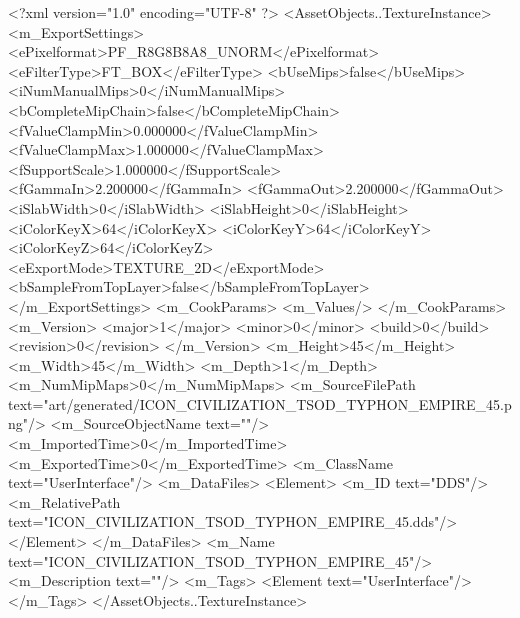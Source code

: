 <?xml version="1.0" encoding="UTF-8" ?>
<AssetObjects..TextureInstance>
	<m_ExportSettings>
		<ePixelformat>PF_R8G8B8A8_UNORM</ePixelformat>
		<eFilterType>FT_BOX</eFilterType>
		<bUseMips>false</bUseMips>
		<iNumManualMips>0</iNumManualMips>
		<bCompleteMipChain>false</bCompleteMipChain>
		<fValueClampMin>0.000000</fValueClampMin>
		<fValueClampMax>1.000000</fValueClampMax>
		<fSupportScale>1.000000</fSupportScale>
		<fGammaIn>2.200000</fGammaIn>
		<fGammaOut>2.200000</fGammaOut>
		<iSlabWidth>0</iSlabWidth>
		<iSlabHeight>0</iSlabHeight>
		<iColorKeyX>64</iColorKeyX>
		<iColorKeyY>64</iColorKeyY>
		<iColorKeyZ>64</iColorKeyZ>
		<eExportMode>TEXTURE_2D</eExportMode>
		<bSampleFromTopLayer>false</bSampleFromTopLayer>
	</m_ExportSettings>
	<m_CookParams>
		<m_Values/>
	</m_CookParams>
	<m_Version>
		<major>1</major>
		<minor>0</minor>
		<build>0</build>
		<revision>0</revision>
	</m_Version>
	<m_Height>45</m_Height>
	<m_Width>45</m_Width>
	<m_Depth>1</m_Depth>
	<m_NumMipMaps>0</m_NumMipMaps>
	<m_SourceFilePath text="art/generated/ICON_CIVILIZATION_TSOD_TYPHON_EMPIRE_45.png"/>
	<m_SourceObjectName text=""/>
	<m_ImportedTime>0</m_ImportedTime>
	<m_ExportedTime>0</m_ExportedTime>
	<m_ClassName text="UserInterface"/>
	<m_DataFiles>
		<Element>
			<m_ID text="DDS"/>
			<m_RelativePath text="ICON_CIVILIZATION_TSOD_TYPHON_EMPIRE_45.dds"/>
		</Element>
	</m_DataFiles>
	<m_Name text="ICON_CIVILIZATION_TSOD_TYPHON_EMPIRE_45"/>
	<m_Description text=""/>
	<m_Tags>
		<Element text="UserInterface"/>
	</m_Tags>
</AssetObjects..TextureInstance>
